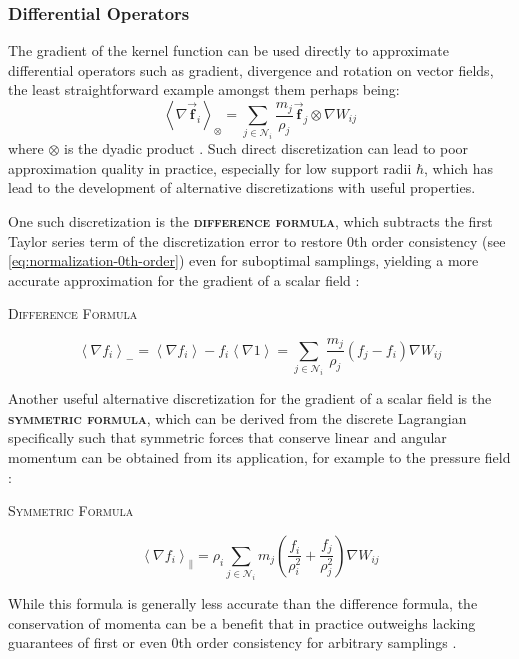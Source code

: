 \documentclass[oneside, a4paper]{book}
\newcommand\emphasis[1]{{\scshape\bfseries#1}}
\newcommand{\equationnamed}[2]{%
  \setlength{\fboxsep}{2pt} %
  \setlength{\fboxrule}{0.01pt}
  \begin{center}
    \begin{minipage}{\textwidth}
      \begin{center}\textsc{#1}\end{center}
      #2
    \end{minipage}
  \end{center}
}
\newcommand\angled[1]{\left\langle#1\right\rangle}
\newcommand\vek[1]{\vec{\bm{#1}}}
\newcommand\br[1]{\left(#1\right)}
\begin{document}
    \subsubsection{Differential Operators}
    The gradient of the kernel function can be used directly to approximate differential operators such as gradient, divergence and rotation on vector fields, the least straightforward example amongst them perhaps being:
    \begin{equation}\label{eq:dyadic-product-sph-sum}
      \angled{\nabla \vek{f}_i}_\otimes = \sum_{j\in\mathcal{N}_i} \frac{m_j}{\rho_j} \vek{f}_j \otimes \nabla W_{ij}
    \end{equation}
    where $\otimes$ is the dyadic product \autocite{tutorial2019}. Such direct discretization can lead to poor approximation quality in practice, especially for low support radii $\hbar$, which has lead to the development of alternative discretizations with useful properties.

    One such discretization is the \emphasis{difference formula}, which subtracts the first Taylor series term of the discretization error to restore 0th order consistency (see \autoref{eq:normalization-0th-order}) even for suboptimal samplings, yielding a more accurate approximation for the gradient of a scalar field \autocites{tutorial2019}{price-2012}:
    \equationnamed{Difference Formula}{\begin{equation}\label{eq:sph-difference}
      \angled{\nabla f_i}_- = \angled{\nabla f_i} - f_i\angled{\nabla 1} = \sum_{j\in\mathcal{N}_i} \frac{m_j}{\rho_j} \br{f_j - f_i} \nabla W_{ij}
    \end{equation}}

    Another useful alternative discretization for the gradient of a scalar field is the \emphasis{symmetric formula}, which can be derived from the discrete Lagrangian specifically such that symmetric forces that conserve linear and angular momentum can be obtained from its application, for example to the pressure field \autocites{tutorial2019}{price-2012}:
    \equationnamed{Symmetric Formula}{
      \begin{equation}\label{eq:sph-symmetric}
        \angled{\nabla f_i}_\parallel = \rho_i\sum_{j\in\mathcal{N}_i} m_j \br{\frac{f_i}{\rho_i^2} + \frac{f_j}{\rho_j^2}} \nabla W_{ij}
      \end{equation}
    }
    While this formula is generally less accurate than the difference formula, the conservation of momenta can be a benefit that in practice outweighs lacking guarantees of first or even 0th order consistency for arbitrary samplings \autocite{tutorial2019}.
\end{document}
